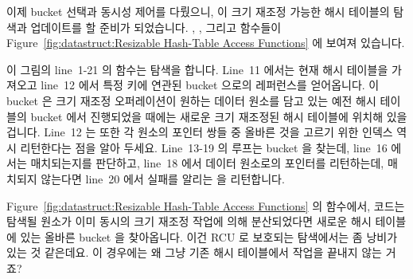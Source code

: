 이제 bucket 선택과 동시성 제어를 다뤘으니, 이 크기 재조정 가능한 해시 테이블의
탐색과 업데이트를 할 준비가 되었습니다.
, , 그리고  함수들이
Figure~\ref{fig:datastruct:Resizable Hash-Table Access Functions} 에 보여져
있습니다.

이 그림의 line~1-21 의  함수는 탐색을 합니다.
Line~11 에서는 현재 해시 테이블을 가져오고 line~12 에서 특정 키에 연관된 bucket
으로의 레퍼런스를 얻어옵니다.
이 bucket 은 크기 재조정 오퍼레이션이 원하는 데이터 원소를 담고 있는 예전 해시
테이블의 bucket 에서 진행되었을 때에는 새로운 크기 재조정된 해시 테이블에
위치해 있을 겁니다.
Line~12 는 또한 각 원소의 포인터 쌍들 중 올바른 것을 고르기 위한 인덱스 역시
리턴한다는 점을 알아 두세요.
Line~13-19 의 루프는 bucket 을 찾는데, line~16 에서는 매치되는지를 판단하고,
line~18 에서 데이터 원소로의 포인터를 리턴하는데, 매치되지 않는다면 line~20
에서 실패를 알리는  을 리턴합니다.

\QuickQuiz{}
	Figure~\ref{fig:datastruct:Resizable Hash-Table Access Functions} 의
	 함수에서, 코드는 탐색될 원소가 이미 동시의 크기
	재조정 작업에 의해 분산되었다면 새로운 해시 테이블에 있는 올바른 bucket
	을 찾아옵니다.
	이건 RCU 로 보호되는 탐색에서는 좀 낭비가 있는 것 같은데요.
	이 경우에는 왜 그냥 기존 해시 테이블에서 작업을 끝내지 않는 거죠?
	\iffalse

